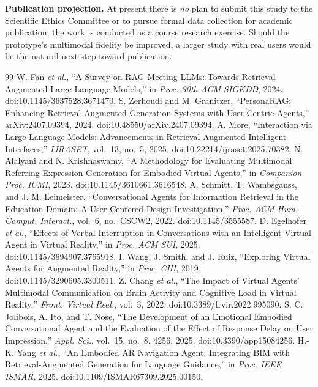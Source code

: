 \documentclass[conference]{IEEEtran}
\begin{document}
\textbf{Publication projection.} At present there is \emph{no} plan to submit
this study to the Scientific Ethics Committee or to pursue formal data collection
for academic publication; the work is conducted as a course research exercise.
Should the prototype's multimodal fidelity be improved, a larger study with real
users would be the natural next step toward publication.


\begin{thebibliography}{99}
 W. Fan \emph{et al.}, ``A Survey on RAG Meeting LLMs: Towards Retrieval-Augmented Large Language Models,'' in \emph{Proc. 30th ACM SIGKDD}, 2024. doi:10.1145/3637528.3671470.
 S. Zerhoudi and M. Granitzer, ``PersonaRAG: Enhancing Retrieval-Augmented Generation Systems with User-Centric Agents,'' arXiv:2407.09394, 2024. doi:10.48550/arXiv.2407.09394.
 A. More, ``Interaction via Large Language Models: Advancements in Retrieval-Augmented Intelligent Interfaces,'' \emph{IJRASET}, vol.\ 13, no.\ 5, 2025. doi:10.22214/ijraset.2025.70382.
 N. Alalyani and N. Krishnaswamy, ``A Methodology for Evaluating Multimodal Referring Expression Generation for Embodied Virtual Agents,'' in \emph{Companion Proc. ICMI}, 2023. doi:10.1145/3610661.3616548.
 A. Schmitt, T. Wambsganss, and J. M. Leimeister, ``Conversational Agents for Information Retrieval in the Education Domain: A User-Centered Design Investigation,'' \emph{Proc. ACM Hum.-Comput. Interact.}, vol.\ 6, no.\ CSCW2, 2022. doi:10.1145/3555587.
 D. Egelhofer \emph{et al.}, ``Effects of Verbal Interruption in Conversations with an Intelligent Virtual Agent in Virtual Reality,'' in \emph{Proc. ACM SUI}, 2025. doi:10.1145/3694907.3765918.
 I. Wang, J. Smith, and J. Ruiz, ``Exploring Virtual Agents for Augmented Reality,'' in \emph{Proc. CHI}, 2019. doi:10.1145/3290605.3300511.
 Z. Chang \emph{et al.}, ``The Impact of Virtual Agents' Multimodal Communication on Brain Activity and Cognitive Load in Virtual Reality,'' \emph{Front. Virtual Real.}, vol.\ 3, 2022. doi:10.3389/frvir.2022.995090.
 S. C. Jolibois, A. Ito, and T. Nose, ``The Development of an Emotional Embodied Conversational Agent and the Evaluation of the Effect of Response Delay on User Impression,'' \emph{Appl. Sci.}, vol.\ 15, no.\ 8, 4256, 2025. doi:10.3390/app15084256.
 H.-K. Yang \emph{et al.}, ``An Embodied AR Navigation Agent: Integrating BIM with Retrieval-Augmented Generation for Language Guidance,'' in \emph{Proc. IEEE ISMAR}, 2025. doi:10.1109/ISMAR67309.2025.00150.

\end{thebibliography}
\end{document}
